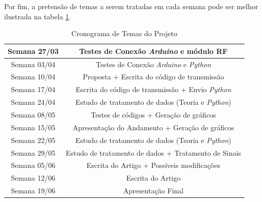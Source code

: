 \documentclass[conference]{IEEEtran}
\begin{document}
Por fim, a pretens\~ao de temas a serem tratadas em cada semana pode ser melhor ilustrada na tabela \ref{table:cronogramaProjeto}.

%

\renewcommand\tablename{TABELA}
\begin{table}[!t]
\renewcommand{\arraystretch}{1.3}
\caption{Cronograma de Temas do Projeto}
\label{table:cronogramaProjeto}
\centering
\begin{tabular}{|c|c|}
\hline
Semana 27/03 & Testes de Conex\~ao \textit{Arduino} e m\'odulo RF\\
\hline
Semana 03/04 & Testes de Conex\~ao \textit{Arduino} e \textit{Python}\\
\hline
Semana 10/04 & Proposta + Escrita do c\'odigo de transmiss\~ao\\
\hline
Semana 17/04 & Escrita do c\'odigo de transmiss\~ao + Envio \textit{Python}\\
\hline
Semana 24/04 & Estudo de tratamento de dados (Teoria e \textit{Python})\\
\hline
Semana 08/05 & Testes de c\'odigos + Gera\c{c}\~ao de gr\'aficos\\
\hline
Semana 15/05 & Apresenta\c{c}\~ao do Andamento + Gera\c{c}\~ao de gr\'aficos\\
\hline
Semana 22/05 & Estudo de tratamento de dados (Teoria e \textit{Python})\\
\hline
Semana 29/05 & Estudo de tratamento de dados + Tratamento de Sinais\\
\hline
Semana 05/06 & Escrita do Artigo + Poss\'iveis modifica\c{c}\~oes\\
\hline
Semana 12/06 & Escrita do Artigo\\
\hline
Semana 19/06 & Apresenta\c{c}\~ao Final\\
\hline
\end{tabular}
\end{table}
\end{document}
